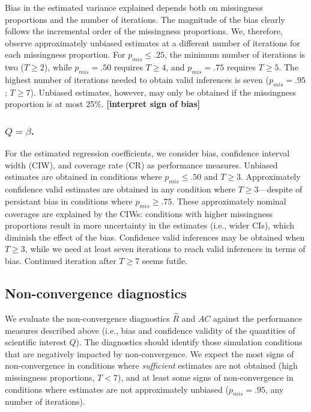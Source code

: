 \documentclass[Royal,times,sageh]{sagej}
\begin{document}
Bias in the estimated variance explained depends both on missingness proportions and the number of iterations. The magnitude of the bias clearly follows the incremental order of the missingness proportions. We, therefore, observe approximately unbiased estimates at a different number of iterations for each missingness proportion. For \(p_{mis}\leq.25\), the minimum number of iterations is two (\(T\geq2\)), while \(p_{mis}=.50\) requires \(T\geq4\), and \(p_{mis}=.75\) requires \(T\geq5\). The highest number of iterations needed to obtain valid inferences is seven (\(p_{mis}=.95\); \(T\geq7\)). Unbiased estimates, however, may only be obtained if the missingness proportion is at most 25\%. \textbf{{[}interpret sign of bias{]}}

\hypertarget{qbeta.}{%
\subsubsection{\texorpdfstring{\(Q=\beta\).}{Q=\textbackslash beta.}}\label{qbeta.}}

For the estimated regression coefficients, we consider bias, confidence interval width (CIW), and coverage rate (CR) as performance measures. Unbiased estimates are obtained in conditions where \(p_{mis}\leq.50\) and \(T\geq3\). Approximately confidence valid estimates are obtained in any condition where \(T\geq3\)---despite of persistant bias in conditions where \(p_{mis}\geq.75\). These approximately nominal coverages are explained by the CIWs: conditions with higher missingness proportions result in more uncertainty in the estimates (i.e., wider CIs), which diminish the effect of the bias. Confidence valid inferences may be obtained when \(T\geq3\), while we need at least seven iterations to reach valid inferences in terms of bias. Continued iteration after \(T\geq7\) seems futile.

\hypertarget{non-convergence-diagnostics-1}{%
\subsection{Non-convergence diagnostics}\label{non-convergence-diagnostics-1}}

We evaluate the non-convergence diagnostics \(\widehat{R}\) and \(AC\) against the performance measures described above (i.e., bias and confidence validity of the quantities of scientific interest \(Q\)). The diagnostics should identify those simulation conditions that are negatively impacted by non-convergence. We expect the most signs of non-convergence in conditions where \emph{sufficient} estimates are not obtained (high missingness proportions, \(T<7\)), and at least some signs of non-convergence in conditions where estimates are not approximately unbiased (\(p_{mis}=.95\), any number of iterations).
\end{document}
